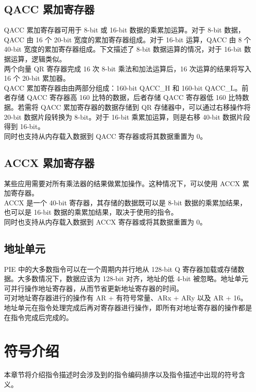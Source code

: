 \documentclass[main\_\_CN.tex]{subfiles}
\begin{document}
\subsection{QACC 累加寄存器}

QACC 累加寄存器可用于 8-bit 或 16-bit 数据的乘累加运算。对于 8-bit 数据，QACC 由 16 个 20-bit 宽度的累加寄存器组成。对于 16-bit 运算，QACC 由 8 个 40-bit 宽度的累加寄存器组成。下文描述了 8-bit 数据运算的情况，对于 16-bit 数据运算，逻辑类似。\\
两个向量 QR 寄存器完成 16 次 8-bit 乘法和加法运算后，16 次运算的结果将写入 16 个 20-bit 累加器。\\
QACC 累加寄存器由由两部分组成：160-bit QACC\_H 和 160-bit QACC\_L。前者存储 QACC 寄存器高 160 比特的数据，后者存储 QACC 寄存器低 160 比特数据。若需将 QACC 累加寄存器的数据存储到 QR 存储器中，可以通过右移操作将 20-bit 数据片段转换为 8-bit。对于 16-bit 乘累加运算，则是右移 40-bit 数据片段得到 16-bit。\\
同时也支持从内存载入数据到 QACC 寄存器或将其数据重置为 0。

\subsection{ACCX 累加寄存器}

某些应用需要对所有乘法器的结果做累加操作。这种情况下，可以使用 ACCX 累加寄存器。\\
ACCX 是一个 40-bit 寄存器，其存储的数据既可以是 8-bit 数据的乘累加结果，也可以是 16-bit 数据的乘累加结果，取决于使用的指令。\\
同时也支持从内存载入数据到 ACCX 寄存器或将其数据重置为 0。

\subsection{地址单元}

PIE 中的大多数指令可以在一个周期内并行地从 128-bit Q 寄存器加载或存储数据。大多数情况下，数据应该为 128-bit 对齐，地址的低 4-bit 被忽略。地址单元可并行操作地址寄存器，从而节省更新地址寄存器的时间。\\
可对地址寄存器进行的操作有 AR + 有符号常量、ARx + ARy 以及 AR + 16。\\
地址单元在指令处理完成后再对寄存器进行操作，即所有对地址寄存器的操作都是在指令完成后完成的。

\section{符号介绍}
本章节将介绍指令描述时会涉及到的指令编码排序以及指令描述中出现的符号含义。
\end{document}

